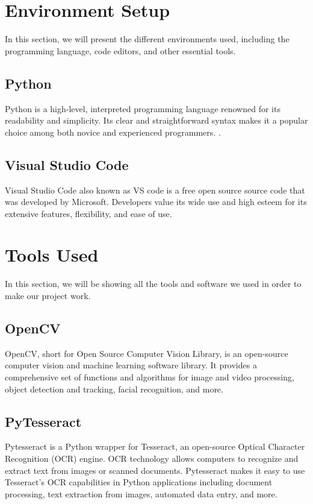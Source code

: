 \section{Environment Setup} 
In this section, we will present the different environments used, including the programming language, code editors, and other essential tools.

\subsection{Python}
Python is a high-level, interpreted programming language renowned for its readability and simplicity. Its clear and straightforward syntax makes it a popular choice among both novice and experienced programmers. \cite{vanrossum2009python}.

\subsection{Visual Studio Code}
Visual Studio Code also known as VS code is a free open source source code that was developed by Microsoft. Developers value its wide use and high esteem for its extensive features, flexibility, and ease of use.

\section{Tools Used}
In this section, we will be showing all the tools and software we used in order to make our project work.

\subsection{OpenCV}
OpenCV, short for Open Source Computer Vision Library, is an open-source computer vision and machine learning software library. It provides a comprehensive set of functions and algorithms for image and video processing, object detection and tracking, facial recognition, and more.

\subsection{PyTesseract}
Pytesseract is a Python wrapper for Tesseract, an open-source Optical Character Recognition (OCR) engine. OCR technology allows computers to recognize and extract text from images or scanned documents. Pytesseract makes it easy to use Tesseract's OCR capabilities in Python applications including document processing, text extraction from images, automated data entry, and more.
